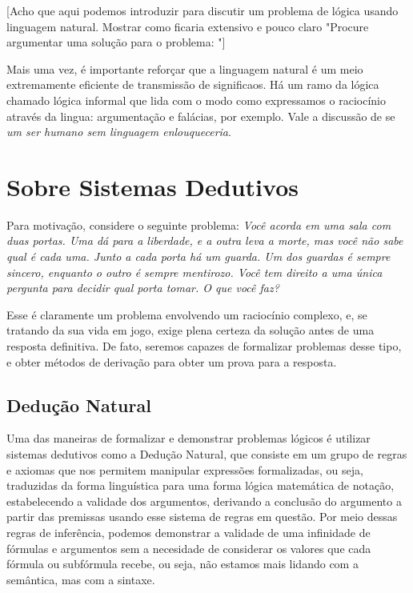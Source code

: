 [Acho que aqui podemos introduzir para discutir um problema de lógica usando linguagem natural. Mostrar como ficaria extensivo e pouco claro "Procure argumentar uma solução para o problema: "]

Mais uma vez, é importante reforçar que a linguagem natural é um meio extremamente eficiente de transmissão de significaos.
Há um ramo da lógica chamado lógica informal que lida com o modo como expressamos o raciocínio através da lingua: argumentação e falácias, por exemplo.
Vale a discussão de se \textit{um ser humano sem linguagem enlouqueceria}.

\section{Sobre Sistemas Dedutivos}
Para motivação, considere o seguinte problema: \textit{Você acorda em uma sala com duas portas. Uma dá para a liberdade, e a outra leva a morte, mas você não sabe qual é cada uma.
Junto a cada porta há um guarda. Um dos guardas é sempre sincero, enquanto o outro é sempre mentirozo. Você tem direito a uma única pergunta para decidir qual porta tomar. O que você faz?}

Esse é claramente um problema envolvendo um raciocínio complexo, e, se tratando da sua vida em jogo, exige plena certeza da solução antes de uma resposta definitiva.
De fato, seremos capazes de formalizar problemas desse tipo, e obter métodos de derivação para obter um prova para a resposta.

\subsection{Dedução Natural}

Uma das maneiras de formalizar e demonstrar problemas lógicos é utilizar sistemas dedutivos como a Dedução Natural, que consiste em um grupo de regras e axiomas que nos permitem manipular expressões formalizadas, ou seja, traduzidas da forma linguística para uma forma lógica matemática de notação, estabelecendo a validade dos argumentos, derivando a conclusão do argumento a partir das premissas usando esse sistema de regras em questão.
Por meio dessas regras de inferência, podemos demonstrar a validade de uma infinidade de fórmulas e argumentos sem a necesidade de considerar os valores que cada fórmula ou subfórmula recebe, ou seja, não estamos mais lidando com a semântica, mas com a sintaxe.

